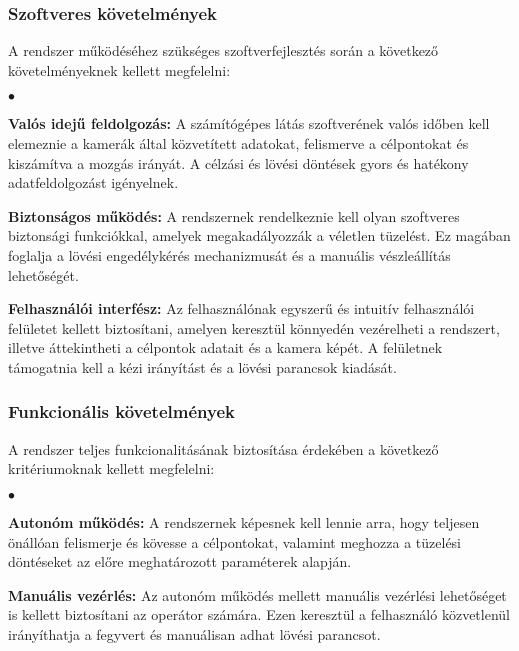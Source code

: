 \subsubsection*{Szoftveres követelmények}

A rendszer működéséhez szükséges szoftverfejlesztés során a következő követelményeknek kellett megfelelni:

\begin{list}{$\bullet$}{}
	\item \textbf{Valós idejű feldolgozás:}  A számítógépes látás szoftverének valós időben kell elemeznie a kamerák által közvetített adatokat, felismerve a célpontokat és kiszámítva a mozgás irányát. A célzási és lövési döntések gyors és hatékony adatfeldolgozást igényelnek.
	\item \textbf{Biztonságos működés:} A rendszernek rendelkeznie kell olyan szoftveres biztonsági funkciókkal, amelyek megakadályozzák a véletlen tüzelést. Ez magában foglalja a lövési engedélykérés mechanizmusát és a manuális vészleállítás lehetőségét.
	\item \textbf{Felhasználói interfész:} Az felhasználónak egyszerű és intuitív felhasználói felületet kellett biztosítani, amelyen keresztül könnyedén vezérelheti a rendszert, illetve áttekintheti a célpontok adatait és a kamera képét. A felületnek támogatnia kell a kézi irányítást és a lövési parancsok kiadását.
\end{list}




\subsubsection*{Funkcionális követelmények}

A rendszer teljes funkcionalitásának biztosítása érdekében a következő kritériumoknak kellett megfelelni:

\begin{list}{$\bullet$}{}
	\item \textbf{Autonóm működés:} A rendszernek képesnek kell lennie arra, hogy teljesen önállóan felismerje és kövesse a célpontokat, valamint meghozza a tüzelési döntéseket az előre meghatározott paraméterek alapján.
	\item \textbf{Manuális vezérlés:} Az autonóm működés mellett manuális vezérlési lehetőséget is kellett biztosítani az operátor számára. Ezen keresztül a felhasználó közvetlenül irányíthatja a fegyvert és manuálisan adhat lövési parancsot.
\end{list}

